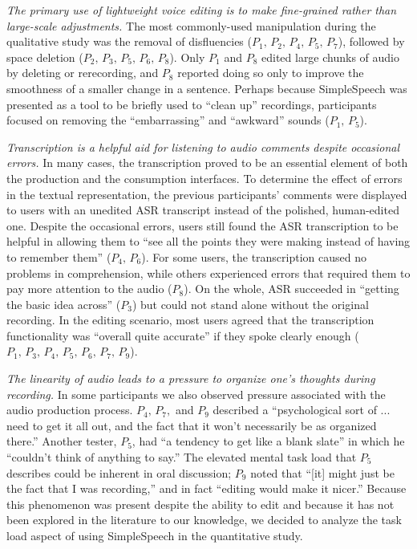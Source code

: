 \emph{The primary use of lightweight voice editing is to make fine-grained rather than large-scale adjustments.}
The most commonly-used manipulation during the qualitative study was the removal of disfluencies ($P_1,\,P_2,\,P_4,\,P_5,\,P_7$), followed by space deletion ($P_2,\,P_3,\,P_5,\,P_6,\,P_8$). 
Only $P_1$ and $P_8$ edited large chunks of audio by deleting or rerecording, and $P_8$ reported doing so only to improve the smoothness of a smaller change in a sentence.
Perhaps because SimpleSpeech was presented as a tool to be briefly used to ``clean up'' recordings, participants focused on removing the ``embarrassing'' and ``awkward'' sounds ($P_1,\,P_5$).

\emph{Transcription is a helpful aid for listening to audio comments despite occasional errors.}
In many cases, the transcription proved to be an essential element of both the production and the consumption interfaces. 
To determine the effect of errors in the textual representation, the previous participants' comments were displayed to users with an unedited ASR transcript instead of the polished, human-edited one. 
Despite the occasional errors, users still found the ASR transcription to be helpful in allowing them to ``see all the points they were making instead of having to remember them'' ($P_4,\,P_6$). 
For some users, the transcription caused no problems in comprehension, while others experienced errors that required them to pay more attention to the audio ($P_8$). 
On the whole, ASR succeeded in ``getting the basic idea across'' ($P_3$) but could not stand alone without the original recording. 
In the editing scenario, most users agreed that the transcription functionality was ``overall quite accurate'' if they spoke clearly enough ($P_1,\,P_3,\,P_4,\,P_5,\,P_6,\,P_7,\,P_9$). 

\emph{The linearity of audio leads to a pressure to organize one's thoughts during recording.}
In some participants we also observed pressure associated with the audio production process. $P_4,\,P_7,$ and $P_9$ described a ``psychological sort of ... need to get it all out, and the fact that it won't necessarily be as organized there.'' 
Another tester, $P_5$, had ``a tendency to get like a blank slate'' in which he ``couldn't think of anything to say.'' 
The elevated mental task load that $P_5$ describes could be inherent in oral discussion; $P_9$ noted that ``[it] might just be the fact that I was recording,'' and in fact ``editing would make it nicer.'' 
Because this phenomenon was present despite the ability to edit and because it has not been explored in the literature to our knowledge, we decided to analyze the task load aspect of using SimpleSpeech in the quantitative study.

